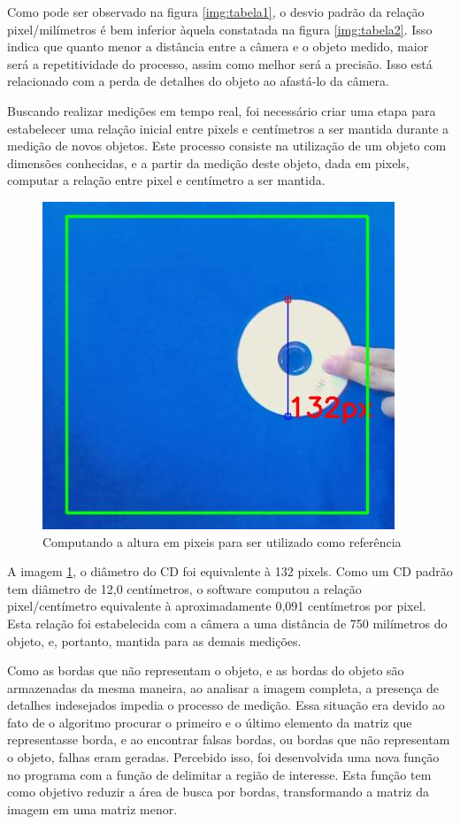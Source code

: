 \documentclass[a4paper,alpha-refs]{RBCA_v1.0}
\begin{document}
Como pode ser observado na figura \ref{img:tabela1}, o desvio padrão da relação pixel/milímetros é bem inferior àquela constatada na figura \ref{img:tabela2}. Isso indica que quanto menor a distância entre a câmera e o objeto medido, maior será a repetitividade do processo, assim como melhor será a precisão. Isso está relacionado com a perda de detalhes do objeto ao afastá-lo da câmera. 

Buscando realizar medições em tempo real, foi necessário criar uma etapa para estabelecer uma relação inicial entre pixels e centímetros a ser mantida durante a medição de novos objetos. Este processo consiste na utilização de um objeto com dimensões conhecidas, e a partir da medição deste objeto, dada em pixels, computar a relação entre pixel e centímetro a ser mantida.

\begin{figure}[h!]
	\centering
	\includegraphics[width=.3\textwidth]{img/04-IMAGEM2.JPG}
	\caption{Computando a altura em pixeis para ser utilizado como referência}
	\label{img:img2}
\end{figure}

A imagem \ref{img:img2}, o diâmetro do CD foi equivalente à 132 pixels. Como um CD padrão tem diâmetro de 12,0 centímetros, o software computou a relação pixel/centímetro equivalente à aproximadamente 0,091 centímetros por pixel. Esta relação foi estabelecida com a câmera a uma distância de 750 milímetros do objeto, e, portanto, mantida para as demais medições.

Como as bordas que não representam o objeto, e as bordas do objeto são armazenadas da mesma maneira, ao analisar a imagem completa, a presença de detalhes indesejados impedia o processo de medição. Essa situação era devido ao fato de o algoritmo procurar o primeiro e o último elemento da matriz que representasse borda, e ao encontrar falsas bordas, ou bordas que não representam o objeto, falhas eram geradas. Percebido isso, foi desenvolvida uma nova função no programa com a função de delimitar a região de interesse. Esta função tem como objetivo reduzir a área de busca por bordas, transformando a matriz da imagem em uma matriz menor.
\end{document}
